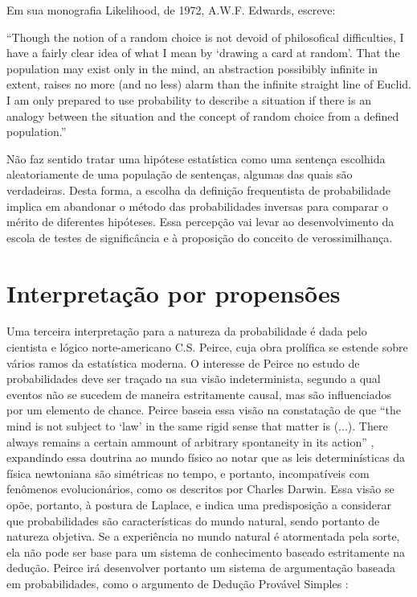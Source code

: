 Em sua monografia Likelihood, de 1972, A.W.F. Edwards, escreve:

``Though the notion of a random choice is not devoid of philosofical difficulties, I have a fairly clear idea of what I mean
by `drawing a card at random'. That the population may exist only in the mind, an abstraction possibibly infinite in extent,
raises no more (and no less) alarm than the infinite straight line of Euclid. I am only prepared to use probability to describe
a situation if there is an analogy between the situation and the concept of random choice from a defined population.''
\citep{Edwards72}

Não faz sentido tratar uma hipótese estatística como uma sentença escolhida aleatoriamente de uma população de sentenças, algumas
das quais são verdadeiras. Desta forma, a escolha da definição frequentista de probabilidade implica em abandonar o método
das probabilidades inversas para comparar o mérito de diferentes hipóteses. Essa percepção vai levar ao desenvolvimento
da escola de testes de significância e à proposição do conceito de verossimilhança.

\section{Interpretação por propensões}

Uma terceira interpretação para a natureza da probabilidade é dada pelo cientista e lógico norte-americano C.S. Peirce,
cuja obra prolífica se estende sobre vários ramos da estatística moderna. O interesse de Peirce no estudo de probabilidades
deve ser traçado na sua visão indeterminista, segundo a qual eventos não se sucedem de maneira estritamente causal, mas são
influenciados por um elemento de chance. Peirce baseia essa visão na constatação de que ``the mind is not subject to `law'
in the same rigid sense that matter is (...). There always remains a certain ammount of arbitrary spontaneity in its action''
\citep{Peirce1892}, expandindo essa doutrina ao mundo físico ao notar que as leis determinísticas 
da física newtoniana são simétricas no tempo, e portanto, incompatíveis com fenômenos evolucionários, como os descritos por
Charles Darwin. Essa visão se opõe, portanto, à postura de Laplace, e indica uma predisposição a considerar que probabilidades
são características do mundo natural, sendo portanto de natureza objetiva. Se a experiência no mundo natural é atormentada
pela sorte, ela não pode ser base para um sistema de conhecimento baseado estritamente na dedução. Peirce irá desenvolver
portanto um sistema de argumentação baseada em probabilidades, como o argumento de Dedução Provável Simples \citep{Fetzer93}:

